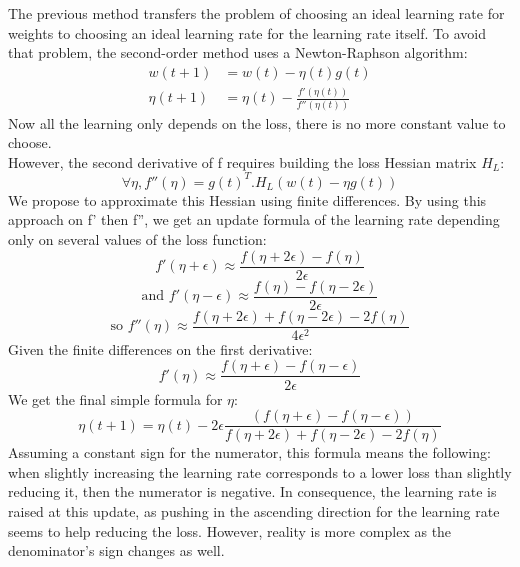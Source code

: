 \documentclass{article}
\begin{document}
  The previous method transfers the problem of choosing an ideal learning rate for weights to choosing an ideal learning rate for the learning rate itself. To avoid that problem, the second-order method uses a Newton-Raphson algorithm:\\
  \begin{align}  
  w(t+1) &= w(t) -\eta(t)g(t)\\
  \eta(t+1) &= \eta(t) - \frac{f'(\eta(t))}{f''(\eta(t))}
  \end{align}
  Now all the learning only depends on the loss, there is no more constant value to choose. \\
  However, the second derivative of f requires building the loss Hessian matrix $H_{L}$:\\
  \begin{equation}
  \forall \eta, f''(\eta) = g(t)^{T}.H_{L}(w(t)-\eta g(t))
  \end{equation}
  We propose to approximate this Hessian using finite differences. By using this approach on f' then f'', we get an update formula of the learning rate depending only on several values of the loss function:\\
  \begin{equation}
  f'(\eta+\epsilon) \approx \frac{f(\eta + 2\epsilon)-f(\eta)}{2\epsilon}
  \end{equation}
  \begin{equation}
  \text{and }f'(\eta-\epsilon) \approx \frac{f(\eta)-f(\eta-2\epsilon)}{2\epsilon}
  \end{equation}  
  \begin{equation}
  \text{so }f''(\eta) \approx \frac{f(\eta+2\epsilon)+f(\eta-2\epsilon)-2f(\eta)}{4 \epsilon^{2}}
  \end{equation}
  Given the finite differences on the first derivative:\\    
  \begin{equation}
  f'(\eta) \approx \frac{f(\eta+\epsilon)-f(\eta-\epsilon)}{2 \epsilon}
  \end{equation}
  We get the final simple formula for $\eta$:\\
  \begin{equation}
  \eta(t+1) = \eta(t) - 2\epsilon\frac{(f(\eta+\epsilon)-f(\eta-\epsilon))}{f(\eta+2\epsilon)+f(\eta-2\epsilon)-2f(\eta)}
  \end{equation}    
  Assuming a constant sign for the numerator, this formula means the following: when slightly increasing the learning rate corresponds to a lower loss than slightly reducing it, then the numerator is negative. In consequence, the learning rate is raised at this update, as pushing in the ascending direction for the learning rate seems to help reducing the loss. However, reality is more complex as the denominator's sign changes as well. 
\end{document}
